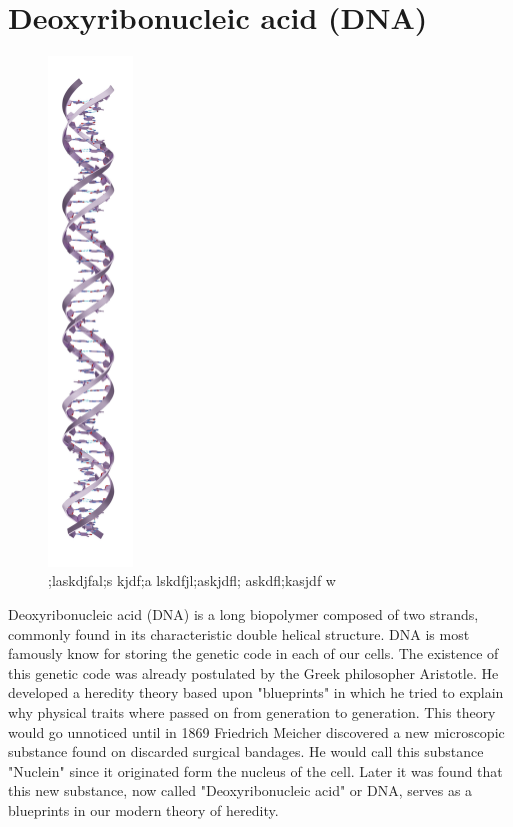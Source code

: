 \section{Deoxyribonucleic acid (DNA)}

\begin{figure}
  \begin{center}
    \includegraphics[width=0.20\textwidth]{Figures/DNA1.png}
  \end{center}
  \caption{;laskdjfal;s kjdf;a lskdfjl;askjdfl; askdfl;kasjdf w}
\end{figure}

Deoxyribonucleic acid (DNA) is a long biopolymer composed of two strands, commonly found
in its characteristic double helical structure. DNA is most famously know for storing the
genetic code in each of our cells. The existence of this genetic code was already
postulated by the Greek philosopher Aristotle. He developed a heredity theory based
upon "blueprints" in which he tried to explain why physical traits where passed on from
generation to generation. This theory would go unnoticed until in 1869
Friedrich Meicher discovered a new microscopic substance found on discarded
surgical bandages. He would call this substance "Nuclein" since it originated
form the nucleus of the cell. Later it was found that this new substance, now called
"Deoxyribonucleic acid" or DNA, serves as a blueprints in our modern theory of
heredity.

